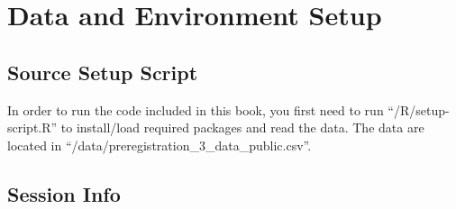 \documentclass[
  letterpaper,
  DIV=11,
  numbers=noendperiod]{scrreprt}
\begin{document}
\chapter{Data and Environment Setup}\label{data-and-environment-setup}

\section{Source Setup Script}\label{source-setup-script}

In order to run the code included in this book, you first need to run
``/R/setup-script.R'' to install/load required packages and read the
data. The data are located in
``/data/preregistration\_3\_data\_public.csv''.

\section{Session Info}\label{session-info}
\end{document}
